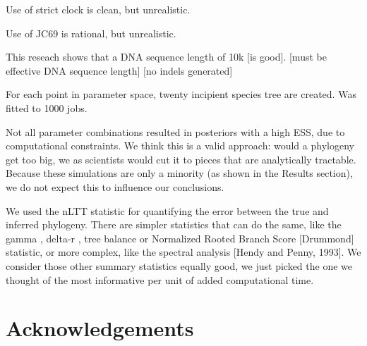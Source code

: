 \documentclass{article}
\begin{document}

Use of strict clock is clean, but unrealistic.



Use of JC69 is rational, but unrealistic.



This reseach shows that a DNA sequence length of 10k [is good].
[must be effective DNA sequence length]
[no indels generated]



For each point in parameter space, twenty incipient species tree are created.
Was fitted to 1000 jobs.


Not all parameter combinations resulted in posteriors with a high ESS,
due to computational constraints. We think this is a valid approach:
would a phylogeny get too big, we as scientists would cut it to
pieces that are analytically tractable. Because these simulations
are only a minority (as shown in the Results section), we do not
expect this to influence our conclusions.


We used the nLTT statistic for quantifying the error between the
true and inferred phylogeny. There are simpler statistics that
can do the same, like the gamma \cite{pagel1999inferring}, 
delta-r \cite{pigot2010shape} , 
tree balance  or
Normalized Rooted Branch Score [Drummond] statistic, 
or more complex, like the spectral analysis [Hendy and Penny, 1993].
We consider those other summary statistics equally good, we just picked the
one we thought of the most informative per unit of added computational time.

%


\section{Acknowledgements}
\end{document}
